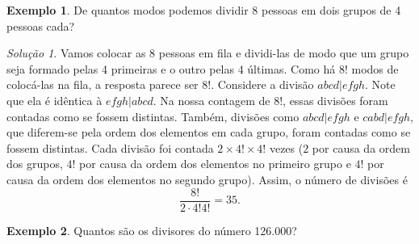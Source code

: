 \documentclass[]{book}
\theoremstyle{definition}
\theoremstyle{definition}
\newtheorem{example}{Exemplo}[chapter]
\theoremstyle{definition}
\theoremstyle{remark}
\newtheorem*{solution}{Solução}
\begin{document}
\begin{example}
\protect\hypertarget{exm:unnamed-chunk-58}{}{\label{exm:unnamed-chunk-58} }De quantos modos podemos dividir 8 pessoas em dois grupos de 4 pessoas cada?
\end{example}

\begin{solution}
\iffalse{} {Solução. } \fi{}Vamos colocar as 8 pessoas em fila e dividi-las de modo que um grupo seja formado pelas 4 primeiras e o outro pelas 4 últimas.
Como há \(8!\) modos de colocá-las na fila, a resposta parece ser \(8!\).
Considere a divisão \(abcd|efgh\).
Note que ela é idêntica à \(efgh|abcd\).
Na nossa contagem de \(8!\), essas divisões foram contadas como se fossem distintas.
Também, divisões como \(abcd|efgh\) e \(cabd|efgh\), que diferem-se pela ordem dos elementos em cada grupo, foram contadas como se fossem distintas.
Cada divisão foi contada \(2\times 4!\times 4!\) vezes (\(2\) por causa da ordem dos grupos, \(4!\) por causa da ordem dos elementos no primeiro grupo e \(4!\) por causa da ordem dos elementos no segundo grupo).
Assim, o número de divisões é
\[\frac{8!}{2\cdot 4!4!}=35.\]
\end{solution}

\begin{example}
\protect\hypertarget{exm:unnamed-chunk-60}{}{\label{exm:unnamed-chunk-60} }Quantos são os divisores do número 126.000?
\end{example}
\end{document}
